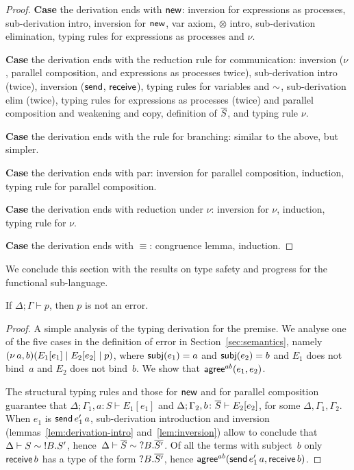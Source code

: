 \begin{proof}
  \textbf{Case} the derivation ends with $\mathsf{new}$: inversion for
  expressions as processes, sub-derivation intro, inversion for
  $\mathsf{new}$, var axiom, $\otimes$ intro, sub-derivation elimination,
  typing rules for expressions as processes and $\nu$.

  \textbf{Case} the derivation ends with the reduction rule for
  communication: inversion ($\nu$, parallel composition, and
  expressions as processes twice), sub-derivation intro (twice),
  inversion ($\mathsf{send}$, $\mathsf{receive}$), typing rules for variables and
  $\sim$, sub-derivation elim (twice), typing rules for
  expressions as processes (twice) and parallel composition and
  weakening and copy, definition of $\overline{S}$, and typing rule $\nu$.

  \textbf{Case} the derivation ends with the rule for branching:
  similar to the above, but simpler.

  \textbf{Case} the derivation ends with par: inversion for parallel
  composition, induction, typing rule for parallel composition.

  \textbf{Case} the derivation ends with reduction under $\nu$:
  inversion for $\nu$, induction, typing rule for $\nu$.

  \textbf{Case} the derivation ends with $\equiv$: congruence lemma,
  induction.
\end{proof}


We conclude this section with the results on type safety and progress
for the functional sub-language.

\begin{theorem}
  \label{thm:safety}
  If $\Delta;\Gamma \vdash p$, then $p$ is not an error.
\end{theorem}
%
\begin{proof}
  A simple analysis of the typing derivation for the premise. We
  analyse one of the five cases in the definition of error in
  Section~\ref{sec:semantics}, namely $(\nu\,{a},b)(E_1[e_1] \mid
  E_2[e_2] \mid p)$,
  where $\mathsf{subj}(e_1)=a$ and $\mathsf{subj}(e_2)=b$ and $E_1$ does not bind~$a$
  and $E_2$ does not bind~$b$. We show that $\mathsf{agree}^{ab}(e_1,e_2)$.
 
  The structural typing rules and those for $\mathsf{new}$ and for parallel
  composition guarantee that
  $\Delta;\Gamma_1,a\colon S \vdash E_1[e_1]$ and
  $\Delta;\Gamma_2,b\colon \overline{S} \vdash E_2[e_2]$, for some
  $\Delta,\Gamma_1,\Gamma_2$. When $e_1$ is $\mathsf{send}\,{e'_1}\,{a}$,
  sub-derivation introduction and inversion
  (lemmas~\ref{lem:derivation-intro} and~\ref{lem:inversion}) allow to
  conclude that $\Delta \vdash S \sim \;!B.S'$,
  hence~$\Delta \vdash \overline{S} \sim \;?B.\overline{S'}$. Of all the
  terms with subject~$b$ only $\mathsf{receive}\,{b}$ has a type of the form
  $?B.\overline{S'}$, hence $\mathsf{agree}^{ab}(\mathsf{send}\,{e'_1}\,{a},\mathsf{receive}\,{b})$.
\end{proof}

